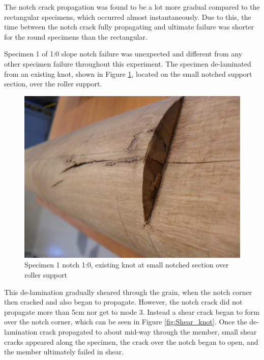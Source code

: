 \documentclass[11pt,a4paper]{article}
\numberwithin{equation}{subsection}
\begin{document}
\noindent
The notch crack propagation was found to be a lot more gradual compared to the rectangular specimens, which occurred almost instantaneously. Due to this, the time between the notch crack fully propagating and ultimate failure was shorter for the round specimens than the rectangular. 

\vspace*{\baselineskip}
\noindent
Specimen 1 of 1:0 slope notch failure was unexpected and different from any other specimen failure throughout this experiment. The specimen de-laminated from an existing knot, shown in Figure \ref{fig:Round_knot}, located on the small notched support section, over the roller support.
 
\vspace*{\baselineskip}

\begin{figure}[h]
	\begin{center}
		\includegraphics[scale=0.1]{Round_knot}
	\end{center}
	\caption{Specimen 1 notch 1:0, existing knot at small notched section over roller support}
	\label{fig:Round_knot}
\end{figure}

\noindent
This de-lamination gradually sheared through the grain, when the notch corner then cracked and also began to propagate. However, the notch crack did not propagate more than 5cm nor get to mode 3. Instead a shear crack began to form over the notch corner, which can be seen in Figure \ref{fig:Shear_knot}. Once the de-lamination crack propagated to about mid-way through the member, small shear cracks appeared along the specimen, the crack over the notch began to open, and the member ultimately failed in shear.  
\end{document}
